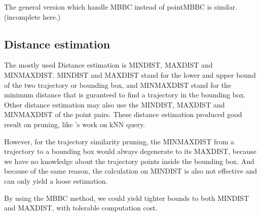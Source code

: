 \documentclass[sigplan]{acmart}
\begin{document}
The general version which handle MBBC instead of pointMBBC is similar.(incomplete here.)

\subsection{Distance estimation}
The mostly used Distance estimation is MINDIST, MAXDIST and MINMAXDIST. MINDIST and MAXDIST stand for the lower and upper bound of the two trajectory or bounding box, and MINMAXDIST stand for the minimum distance that is guranteed to find a trajectory in the bounding box. Other distance estimation may also use the MINDIST, MAXDIST and MINMAXDIST of the point pairs. These distance estimation produced good result on pruning, like \cite{roussopoulos1995nearest}'s work on kNN query.\par
However, for the trajectory similarity pruning, the MINMAXDIST from a trajectory to a bounding box would always degenerate to its MAXDIST, because we have no knowledge about the trajectory points inside the bounding box. And because of the same reason, the calculation on MINDIST is also not effective and can only yield a loose estimation.\par
By using the MBBC method, we could yield tighter bounds to both MINDIST and MAXDIST, with tolerable computation cost. \par
\end{document}
